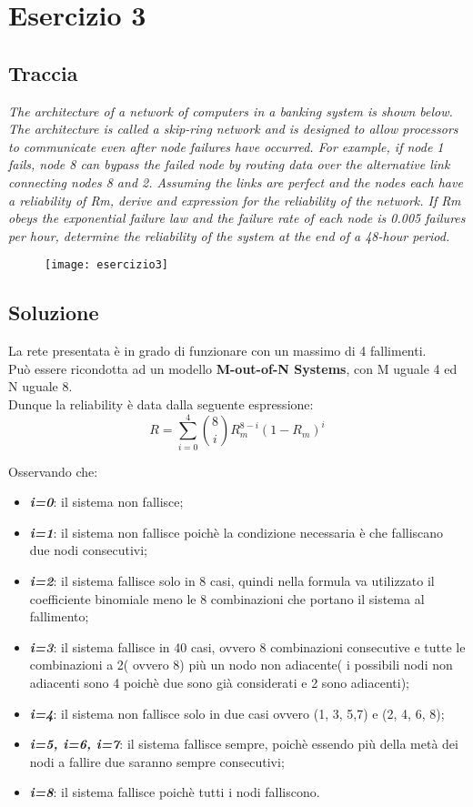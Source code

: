 \clearpage

\section{Esercizio 3}
\subsection{Traccia}
\textit{The architecture of a network of computers in a banking system is shown
below. The architecture is called a skip-ring network and is designed to allow
processors to communicate even after node failures have occurred. For example,
if node 1 fails, node 8 can bypass the failed node by routing data over the
alternative link connecting nodes 8 and 2. Assuming the links are perfect and
the nodes each have a reliability of Rm, derive and expression for the reliability
of the network. If Rm obeys the exponential failure law and the failure rate of
each node is 0.005 failures per hour, determine the reliability of the system
at the end of a 48-hour period.}
\begin{figure}[!htbp]
  \centering
  \texttt{[image: esercizio3]}
\end{figure}

\clearpage
\subsection{Soluzione}

La rete presentata è in grado di funzionare con un massimo di 4 fallimenti.\\
Può essere ricondotta ad un modello \textbf{M-out-of-N Systems}, con M uguale 4
ed N uguale 8.\\
Dunque la reliability è data dalla seguente espressione:
$$ R = \sum_{i=0}^{4}{\binom{8}{i}R_m^{8-i}(1-R_m)^i}$$

Osservando che:
\begin{itemize}
  \item \textbf{\textit{i=0}}: il sistema non fallisce;
  \item \textbf{\textit{i=1}}: il sistema non fallisce poichè la condizione necessaria
  è che falliscano due nodi consecutivi;
  \item \textbf{\textit{i=2}}: il sistema fallisce solo in 8 casi, quindi
  nella formula va utilizzato il coefficiente binomiale meno le 8 combinazioni che
  portano il sistema al fallimento;
  \item \textbf{\textit{i=3}}: il sistema fallisce in 40 casi, ovvero 8 combinazioni
  consecutive e tutte le combinazioni a 2( ovvero 8) più un nodo non adiacente( i
  possibili nodi non adiacenti sono 4 poichè due sono già considerati e 2 sono adiacenti);
  \item \textbf{\textit{i=4}}: il sistema non fallisce solo in due casi ovvero (1, 3, 5,7) e (2, 4, 6, 8);
  \item \textbf{\textit{i=5, i=6, i=7}}: il sistema fallisce sempre, poichè essendo più della
  metà dei nodi a fallire due saranno sempre consecutivi;
  \item \textbf{\textit{i=8}}: il sistema fallisce poichè tutti i nodi falliscono.
\end{itemize}

